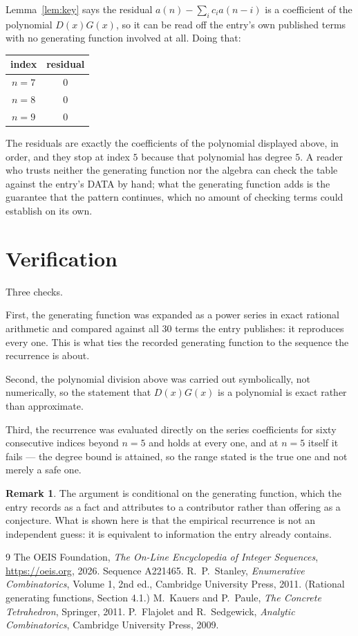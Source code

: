 \documentclass[11pt,a4paper]{article}
\theoremstyle{plain}
\theoremstyle{definition}
\newtheorem{remark}[theorem]{Remark}
\begin{document}
Lemma~\ref{lem:key} says the residual $a(n)-\sum_ic_ia(n-i)$ is a coefficient of the
polynomial $D(x)G(x)$, so it can be read off the entry's own published terms with no
generating function involved at all. Doing that:
\begin{center}
\begin{tabular}{cc}
index & residual \\ \hline
$n=7$ & $0$ \\
$n=8$ & $0$ \\
$n=9$ & $0$
\end{tabular}
\end{center}
The residuals are exactly the coefficients of the polynomial displayed above, in order, and
they stop at index $5$ because that polynomial has degree $5$. A reader who trusts
neither the generating function nor the algebra can check the table against the entry's DATA
by hand; what the generating function adds is the guarantee that the pattern continues, which
no amount of checking terms could establish on its own.

\section{Verification}

Three checks.

First, the generating function was expanded as a power series in exact rational arithmetic and
compared against all $30$ terms the entry publishes: it reproduces every one. This is
what ties the recorded generating function to the sequence the recurrence is about.

Second, the polynomial division above was carried out symbolically, not numerically, so the
statement that $D(x)G(x)$ is a polynomial is exact rather than approximate.

Third, the recurrence was evaluated directly on the series coefficients for sixty consecutive
indices beyond $n=5$ and holds at every one, and at $n=5$ itself it fails --- the
degree bound is attained, so the range stated is the true one and not merely a safe one.

\begin{remark}
The argument is conditional on the generating function, which the entry records as a fact and
attributes to a contributor rather than offering as a conjecture. What is shown here is that
the empirical recurrence is not an independent guess: it is equivalent to information the
entry already contains.
\end{remark}

\begin{thebibliography}{9}
 The OEIS Foundation, \emph{The On-Line Encyclopedia of Integer
Sequences}, \url{https://oeis.org}, 2026. Sequence A221465.
 R.~P.~Stanley, \emph{Enumerative Combinatorics}, Volume 1, 2nd ed.,
Cambridge University Press, 2011. (Rational generating functions, Section 4.1.)
 M.~Kauers and P.~Paule, \emph{The Concrete Tetrahedron}, Springer, 2011.
 P.~Flajolet and R.~Sedgewick, \emph{Analytic Combinatorics}, Cambridge
University Press, 2009.
\end{thebibliography}
\end{document}
